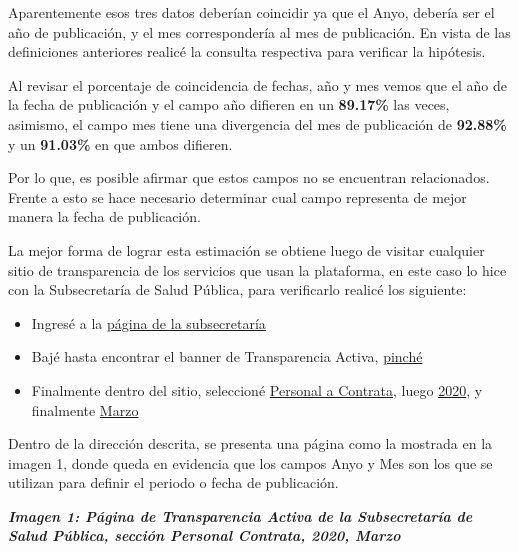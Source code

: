 \documentclass[11pt]{article}
\providecommand{\tightlist}{%
      \setlength{\itemsep}{0pt}\setlength{\parskip}{0pt}}
\begin{document}
Aparentemente esos tres datos deberían coincidir ya que el Anyo, debería
ser el año de publicación, y el mes correspondería al mes de
publicación. En vista de las definiciones anteriores realicé la consulta
respectiva para verificar la hipótesis.

    Al revisar el porcentaje de coincidencia de fechas, año y mes vemos que
el año de la fecha de publicación y el campo año difieren en un
\textbf{89.17\%} las veces, asimismo, el campo mes tiene una divergencia
del mes de publicación de \textbf{92.88\%} y un \textbf{91.03\%} en que
ambos difieren.

Por lo que, es posible afirmar que estos campos no se encuentran
relacionados. Frente a esto se hace necesario determinar cual campo
representa de mejor manera la fecha de publicación.

La mejor forma de lograr esta estimación se obtiene luego de visitar
cualquier sitio de transparencia de los servicios que usan la
plataforma, en este caso lo hice con la Subsecretaría de Salud Pública,
para verificarlo realicé los siguiente:

\begin{itemize}
\tightlist
\item
  Ingresé a la \href{https://www.minsal.cl/}{página de la subsecretaría}
\item
  Bajé hasta encontrar el banner de Transparencia Activa,
  \href{https://www.portaltransparencia.cl/PortalPdT/pdtta?codOrganismo=AO001}{pinché}
\item
  Finalmente dentro del sitio, seleccioné
  \href{https://www.portaltransparencia.cl/PortalPdT/pdtta/-/ta/AO001/PR/PCONT}{Personal
  a Contrata}, luego
  \href{https://www.portaltransparencia.cl/PortalPdT/pdtta/-/ta/AO001/PR/PCONT/46305762}{2020},
  y finalmente
  \href{https://www.portaltransparencia.cl/PortalPdT/pdtta/-/ta/AO001/PR/PCONT/46305831}{Marzo}
\end{itemize}

Dentro de la dirección descrita, se presenta una página como la mostrada
en la imagen 1, donde queda en evidencia que los campos Anyo y Mes son
los que se utilizan para definir el periodo o fecha de publicación.

\textbf{\emph{Imagen 1: Página de Transparencia Activa de la
Subsecretaría de Salud Pública, sección Personal Contrata, 2020, Marzo}}

    \begin{center}
    \end{center}
\end{document}

